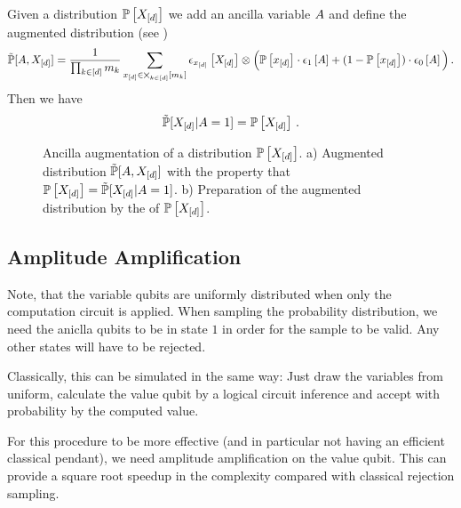 Given a distribution $\mathbb{P}\left[X_{[d]}\right]$ we add an ancilla variable $A$ and define the augmented distribution (see )
\begin{align*}
    \tilde{\mathbb{P}}[A,X_{[d]}] =
    \frac{1}{\prod_{k\in[d]}m_{k}}
    \sum_{x_{[d]}\in\bigtimes_{k\in[d]}[m_{k}]} \epsilon_{x_{[d]}}\left[X_{[d]}\right]
    \otimes \Big(
    \mathbb{P}\left[x_{[d]}\right] \cdot \epsilon_{1}\left[A\right] + (1- \mathbb{P}\left[x_{[d]}\right]) \cdot \epsilon_{0}\left[A\right]
    \Big) \, .
\end{align*}
Then we have
\begin{align*}
    \tilde{\mathbb{P}}[X_{[d]}|A=1] = \mathbb{P}\left[X_{[d]}\right] \, .
\end{align*}

\begin{figure}
    \begin{center}
        
    \end{center}
    \caption{
        Ancilla augmentation of a distribution $\mathbb{P}\left[X_{[d]}\right]$.
        a) Augmented distribution $\tilde{\mathbb{P}}[A,X_{[d]}]$ with the property that $\mathbb{P}\left[X_{[d]}\right] = \tilde{\mathbb{P}}[X_{[d]}|A=1]$.
        b) Preparation of the augmented distribution by the \activationCircuit{} of $\mathbb{P}\left[X_{[d]}\right]$.
    }\label{fig:ancillaAugmentation}
\end{figure}

\subsection{Amplitude Amplification}

Note, that the variable qubits are uniformly distributed when only the computation circuit is applied.
When sampling the probability distribution, we need the aniclla qubits to be in state $1$ in order for the sample to be valid.
Any other states will have to be rejected.

Classically, this can be simulated in the same way:
Just draw the variables from uniform, calculate the value qubit by a logical circuit inference and accept with probability by the computed value.

For this procedure to be more effective (and in particular not having an efficient classical pendant), we need amplitude amplification on the value qubit.
This can provide a square root speedup in the complexity compared with classical rejection sampling.

